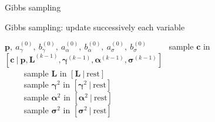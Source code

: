 \documentclass[10pt,xcolor=x11names,compress, notes=show]{beamer}%
\begin{document}
\begin{frame}{Gibbs sampling}
\begin{minipage}{0.4\textwidth}
	\end{minipage}
	\vfill
	\begin{minipage}{\textwidth}
			Gibbs sampling: update successively each variable			
			\begin{center}				
				\begin{minipage}{0.9\textwidth}
					\begin{algorithmic}
						\REQUIRE $\bm{p},~a_\gamma^{(0)},~b_\gamma^{(0)},~a_\alpha^{(0)},~b_\alpha^{(0)},~a_\sigma^{(0)},~b_\sigma^{(0)}$ %
							\STATE~~~~ sample $\bm{c}$ in $[\bm{c}~|~\bm{p},\bm{L}^{(k-1)},\bm{\gamma}^{(k-1)},\bm{\alpha}^{(k-1)},\bm{\sigma}^{(k-1)} ]$\\
							\STATE~~~~ sample $\bm{L}$ in $[\bm{L}~|~\text{rest}  ]$\\
							\STATE~~~~ sample $\bm{\gamma}^2$ in $[\bm{\gamma}^2~|~ \text{rest}  ]$\\
							\STATE~~~~ sample $\bm{\alpha}^2$ in $[\bm{\alpha}^2~|~\text{rest}  ]$\\
							\STATE~~~~ sample $\bm{\sigma}^2$ in $[\bm{\sigma}^2~|~ \text{rest}  ]$\\
						\ENDFOR
					\end{algorithmic}
				\end{minipage}				
			\end{center}
	\end{minipage}
\end{frame}

\setcounter{framenumber}{\value{finalframe}}




% 
% 
\end{document}
